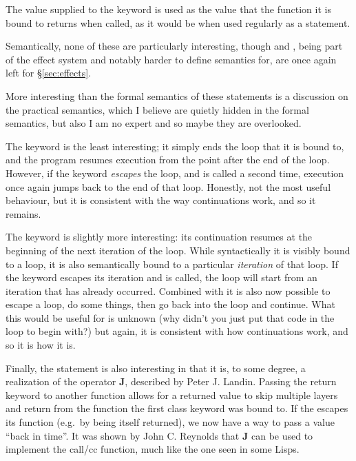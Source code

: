 The value supplied to the  keyword is used as the value that the function
it is bound to returns when called, as it would be when used regularly as a statement.

Semantically, none of these are particularly interesting, though  and , being
part of the effect system and notably harder to define semantics for, are once again
left for \S\ref{sec:effects}.

\begin{prooftree}
\end{prooftree}

\begin{prooftree}
\end{prooftree}

\begin{prooftree}
\end{prooftree}

More interesting than the formal semantics of these statements is a discussion on
the practical semantics, which I believe are quietly hidden in the formal semantics,
but also I am no expert and so maybe they are overlooked.

The  keyword is the least interesting; it simply ends the loop that it
is bound to, and the program resumes execution from the point after the end of the
loop. However, if the  keyword \emph{escapes} the loop, and is called
a second time, execution once again jumps back to the end of that loop. Honestly, not
the most useful behaviour, but it is consistent with the way continuations work, and
so it remains.

The  keyword is slightly more interesting: its continuation resumes
at the beginning of the next iteration of the loop. While syntactically it is visibly
bound to a loop, it is also semantically bound to a particular \emph{iteration} of
that loop. If the  keyword escapes its iteration and is called,
the loop will start from an iteration that has already occurred. Combined with
 it is also now possible to escape a loop, do some things, then go back
into the loop and continue. What this would be useful for is unknown (why didn't
you just put that code in the loop to begin with?) but again, it is consistent with
how continuations work, and so it is how it is.

Finally, the  statement is also interesting in that it is, to some degree,
a realization of the operator \textbf{J}, described by Peter J. Landin\cite{j}.
Passing the return keyword to another function allows for a returned value to skip
multiple layers and return from the function the first class keyword was bound to.
If the  escapes its function (e.g.\ by being itself returned), we now have
a way to pass a value ``back in time''. It was shown by John C. Reynolds that \textbf{J}
can be used to implement the call/cc function, much like the one seen in some Lisps\cite{defint}.
